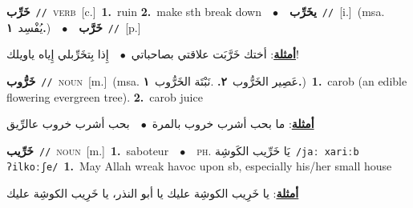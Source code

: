 \documentclass[10pt,a4paper,twoside]{article} %
\begin{document}
\begin{multicols}{2}
{{{{{{{{{{{\setlength\topsep{0pt}\textbf{\foreignlanguage{arabic}{خَرِّب}}\ {\color{gray}\texttt{//}\color{black}}\ \textsc{verb}\ [c.]\ \textbf{1.}~ruin  \textbf{2.}~make sth break down\ \ $\bullet$\ \ \setlength\topsep{0pt}\textbf{\foreignlanguage{arabic}{يخَرِّب}}\ {\color{gray}\texttt{//}\color{black}}\ [i.]\ \color{gray}(msa. \foreignlanguage{arabic}{يُفْسِد}~\foreignlanguage{arabic}{\textbf{١.}})\color{black}\ \ $\bullet$\ \ \setlength\topsep{0pt}\textbf{\foreignlanguage{arabic}{خَرَّب}}\ {\color{gray}\texttt{//}\color{black}}\ [p.]\  \begin{flushright}\color{gray}\foreignlanguage{arabic}{\textbf{\underline{\foreignlanguage{arabic}{أمثلة}}}: أختك خَرَّبَت علاقتي بصاحباتي\ $\bullet$\ \  إِذا بِتخَرِّبلي إِياه ياويلك!}\end{flushright}\color{black}} \vspace{2mm}

{\setlength\topsep{0pt}\textbf{\foreignlanguage{arabic}{خَرُّوب}}\ {\color{gray}\texttt{//}\color{black}}\ \textsc{noun}\ [m.]\ \color{gray}(msa. \foreignlanguage{arabic}{عَصِير الخَرُّوب}~\foreignlanguage{arabic}{\textbf{٢.}}  .\foreignlanguage{arabic}{نَبْتَة الخَرُّوب}~\foreignlanguage{arabic}{\textbf{١.}})\color{black}\ \textbf{1.}~carob (an edible flowering evergreen tree).  \textbf{2.}~carob juice\  \begin{flushright}\color{gray}\foreignlanguage{arabic}{\textbf{\underline{\foreignlanguage{arabic}{أمثلة}}}: ما بحب أشرب خروب بالمرة\ $\bullet$\ \  بحب أشرب خروب عالرِّيق}\end{flushright}\color{black}} \vspace{2mm}

{\setlength\topsep{0pt}\textbf{\foreignlanguage{arabic}{خَرِّيب}}\ {\color{gray}\texttt{//}\color{black}}\ \textsc{noun}\ [m.]\ \textbf{1.}~saboteur\ \ $\bullet$\ \ \textsc{ph.} \color{gray} \foreignlanguage{arabic}{يَا خَرِّيب الكَوشِة}\color{black}\ {\color{gray}\texttt{/{\sffamily jaː xariːb ʔilkoːʃe}/}\color{black}}\ \textbf{1.}~May Allah wreak havoc upon sb, especially his/her small house\  \begin{flushright}\color{gray}\foreignlanguage{arabic}{\textbf{\underline{\foreignlanguage{arabic}{أمثلة}}}: يا خَرِيب الكوشِة عليك يا أبو النذر، يا خَرِيب الكوشِة عليك}\end{flushright}\color{black}} \vspace{2mm}

}}}}}}}}}}
\end{multicols}
\end{document}
